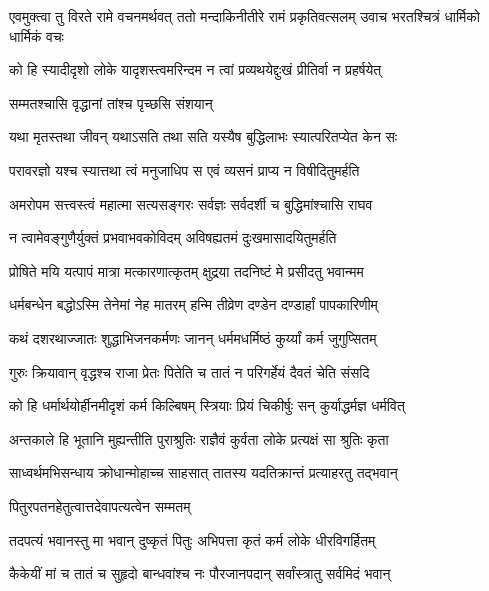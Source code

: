 
\threelineshloka
{एवमुक्त्वा तु विरते रामे वचनमर्थवत्}
{ततो मन्दाकिनीतीरे रामं प्रकृतिवत्सलम्}
{उवाच भरतश्चित्रं धार्मिको धार्मिकं वचः} %

\twolineshloka
{को हि स्यादीदृशो लोके यादृशस्त्वमरिन्दम}
{न त्वां प्रव्यथयेद्दुःखं प्रीतिर्वा न प्रहर्षयेत्} %

\onelineshloka
{सम्मतश्चासि वृद्धानां तांश्च पृच्छसि संशयान्} %

\twolineshloka
{यथा मृतस्तथा जीवन् यथाऽसति तथा सति}
{यस्यैष बुद्धिलाभः स्यात्परितप्येत केन सः} %

\twolineshloka
{परावरज्ञो यश्च स्यात्तथा त्वं मनुजाधिप}
{स एवं व्यसनं प्राप्य न विषीदितुमर्हति} %

\twolineshloka
{अमरोपम सत्त्वस्त्वं महात्मा सत्यसङ्गरः}
{सर्वज्ञः सर्वदर्शी च बुद्धिमांश्चासि राघव} %

\twolineshloka
{न त्वामेवङ्गुणैर्युक्तं प्रभवाभवकोविदम्}
{अविषह्यतमं दुःखमासादयितुमर्हति} %

\twolineshloka
{प्रोषिते मयि यत्पापं मात्रा मत्कारणात्कृतम्}
{क्षुद्रया तदनिष्टं मे प्रसीदतु भवान्मम} %

\twolineshloka
{धर्मबन्धेन बद्धोऽस्मि तेनेमां नेह मातरम्}
{हन्मि तीव्रेण दण्डेन दण्डार्हां पापकारिणीम्} %

\twolineshloka
{कथं दशरथाज्जातः शुद्धाभिजनकर्मणः}
{जानन् धर्ममधर्मिष्ठं कुर्य्यां कर्म जुगुप्सितम्} %

\twolineshloka
{गुरुः क्रियावान् वृद्धश्च राजा प्रेतः पितेति च}
{तातं न परिगर्हेयं दैवतं चेति संसदि} %

\twolineshloka
{को हि धर्मार्थयोर्हीनमीदृशं कर्म किल्बिषम्}
{स्त्रियाः प्रियं चिकीर्षुः सन् कुर्याद्धर्मज्ञ धर्मवित्} %

\twolineshloka
{अन्तकाले हि भूतानि मुह्यन्तीति पुराश्रुतिः}
{राज्ञैवं कुर्वता लोके प्रत्यक्षं सा श्रुतिः कृता} %

\twolineshloka
{साध्वर्थमभिसन्धाय क्रोधान्मोहाच्च साहसात्}
{तातस्य यदतिक्रान्तं प्रत्याहरतु तद्भवान्} %

\onelineshloka
{पितुरपतनहेतुत्वात्तदेवापत्यत्वेन सम्मतम्} %

\twolineshloka
{तदपत्यं भवानस्तु मा भवान् दुष्कृतं पितुः}
{अभिपत्ता कृतं कर्म लोके धीरविगर्हितम्} %

\twolineshloka
{कैकेयीं मां च तातं च सुहृदो बान्धवांश्च नः}
{पौरजानपदान् सर्वांस्त्रातु सर्वमिदं भवान्} %

